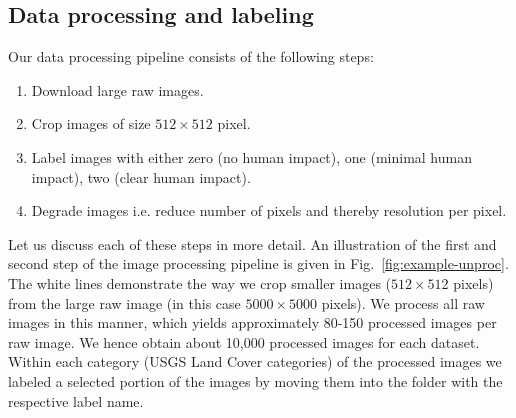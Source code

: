 \subsection{Data processing and labeling}
Our data processing pipeline consists of the following steps:
\begin{enumerate}
	\item Download large raw images.
	\item Crop images of size $512\times512$ pixel.
	\item Label images with either zero (no human impact), one (minimal human impact), two (clear human impact).
	\item Degrade images i.e. reduce number of pixels and thereby resolution per pixel.
\end{enumerate}

Let us discuss each of these steps in more detail. An illustration of the first and second step of the image processing pipeline is given in Fig.~\ref{fig:example-unproc}. The white lines demonstrate the way we crop smaller images ($512\times512$ pixels) from the large raw image (in this case $5000\times5000$ pixels). We process all raw images in this manner, which yields approximately 80-150 processed images per raw image. We hence obtain about 10,000 processed images for each dataset. Within each category (USGS Land Cover categories) of the processed images we labeled a selected portion of the images by moving them into the folder with the respective label name. 

